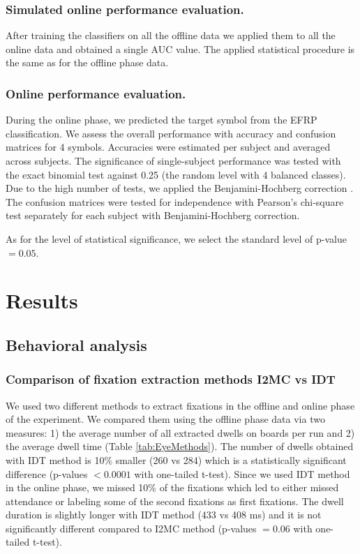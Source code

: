 \documentclass[12pt]{iopart}
\begin{document}
\subsubsection*{Simulated online performance evaluation.}
After training the classifiers on all the offline data we applied them 
to all the online data and obtained a single AUC value.
The applied statistical procedure is the same as for the offline phase data.

\subsubsection*{Online performance evaluation.}
During the online phase, we predicted the target symbol from the EFRP classification.
We assess the overall performance with accuracy and confusion matrices
for 4 symbols. Accuracies were estimated per subject and averaged across subjects.
The significance of single-subject performance was tested with the exact binomial test against
0.25 (the random level with 4 balanced classes). Due to the high number of tests,
we applied the Benjamini-Hochberg correction \cite{benjamini_controlling_1995}.
The confusion matrices were tested for independence
with Pearson's chi-square test \cite{frs_x_1900} separately for each subject 
with Benjamini-Hochberg correction.

As for the level of statistical significance, we select the standard level of p-value $= 0.05$.

\section{Results}
\label{sec:results}
\subsection{Behavioral analysis}

\subsubsection*{Comparison of fixation extraction methods I2MC vs IDT}
We used two different methods to extract fixations in the offline 
and online phase of the experiment. We compared them using
the offline phase data via two measures: 1) the average number of all extracted
dwells on boards per run and 2) the average dwell time (Table \ref{tab:EyeMethods}).
The number of dwells obtained with IDT method is 10\% smaller (260 vs 284)
which is a statistically significant difference
(p-values $< 0.0001$ with one-tailed t-test).
Since we used IDT method in the online phase,
we missed 10\% of the fixations which led
to either missed attendance or labeling some of the second
fixations as first fixations.
The dwell duration is slightly longer with IDT method (433 vs 408 ms)
and it is not significantly different compared to I2MC method
(p-values $= 0.06$ with one-tailed t-test).
\end{document}

